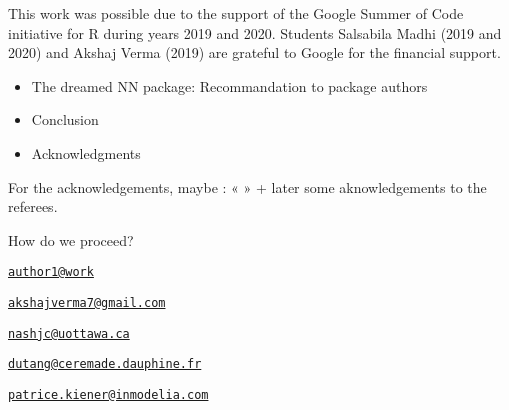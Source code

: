 This work was possible due to the support of the Google Summer of Code
initiative for R during years 2019 and 2020. Students Salsabila Madhi
(2019 and 2020) and Akshaj Verma (2019) are grateful to Google for the
financial support.



\begin{itemize}
\tightlist
\item
  The dreamed NN package: Recommandation to package authors
\item
  Conclusion
\item
  Acknowledgments
\end{itemize}

For the acknowledgements, maybe : « » + later some aknowledgements to
the referees.

How do we proceed?


\address{%
Salsabila Mahdi\\
Affiliation\\
line 1\\ line 2\\
}
\href{mailto:author1@work}{\nolinkurl{author1@work}}

\address{%
Akshaj Verma\\
Affiliation\\
line 1\\ line 2\\
}
\href{mailto:akshajverma7@gmail.com}{\nolinkurl{akshajverma7@gmail.com}}

\address{%
John C. Nash\\
Affiliation\\
line 1\\ line 2\\
}
\href{mailto:nashjc@uottawa.ca}{\nolinkurl{nashjc@uottawa.ca}}

\address{%
Christophe Dutang\\
Univ. Paris-Dauphine, Univ. PSL, CNRS, CEREMADE\\
Place du Ml de Lattre de Tassigny, 75016 Paris, France\\
}
\href{mailto:dutang@ceremade.dauphine.fr}{\nolinkurl{dutang@ceremade.dauphine.fr}}

\address{%
Patrice Kiener\\
InModelia\\
5 rue Malebranche, 75005 Paris, France\\
}
\href{mailto:patrice.kiener@inmodelia.com}{\nolinkurl{patrice.kiener@inmodelia.com}}
